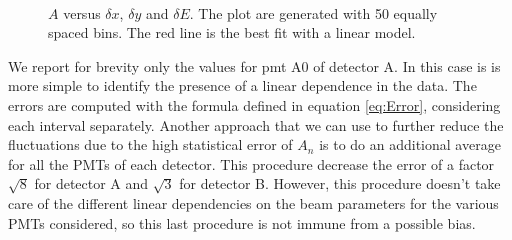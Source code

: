 \begin{figure}[hbtp]
\centering
{}
\\
\caption{ $A$ versus $\delta x$, $\delta y$ and $\delta E$. The plot are generated with 50 equally spaced bins. The red line is the best fit with a linear model.}
\end{figure} 

We report for brevity only the values for pmt A0 of detector A. In this case is is more simple to identify the presence of a linear dependence in the data. 
The errors are computed with the formula defined in equation \ref{eq:Error}, considering each interval separately.
Another approach that we can use to further reduce the fluctuations due to the high statistical error of $A_{n}$ is to do an additional average for all the PMTs of each detector. This procedure decrease the error of a factor $\sqrt{8}$ for detector A and $\sqrt{3}$ for detector B. However, this procedure doesn't take care of the different linear dependencies on the beam parameters for the various PMTs considered, so this last procedure is not immune from a possible bias. 

